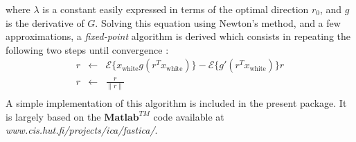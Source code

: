 where $\lambda$ is a constant easily expressed in terms of the optimal direction $r_0$, and $g$ is the derivative of $G$. Solving this 
equation using Newton's method, and a few approximations, a \emph{fixed-point} algorithm is derived which consists in repeating the 
following two steps until convergence :
\begin{eqnarray}
r  & \leftarrow & \mathcal{E} \{ x_{\textrm{white}} g(r^T x_{\textrm{white}}  ) \} - \mathcal{E} \{ g'(r^T x_{\textrm{white}}  ) \} r     \nonumber  \\
r  & \leftarrow  &  \frac{r}{\| r \|}   \nonumber	   \\
\end{eqnarray}
A simple implementation of this algorithm is included in the present package. It is largely based on the $\textbf{Matlab}^{TM}$ code 
available at \emph{www.cis.hut.fi/projects/ica/fastica/}. 

